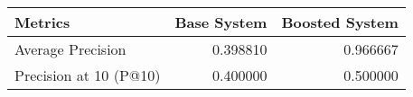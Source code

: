 \begin{tabular}{lrr}
\toprule
Metrics & Base System & Boosted System \\
\midrule
Average Precision & 0.398810 & 0.966667 \\
Precision at 10 (P@10) & 0.400000 & 0.500000 \\
\bottomrule
\end{tabular}
